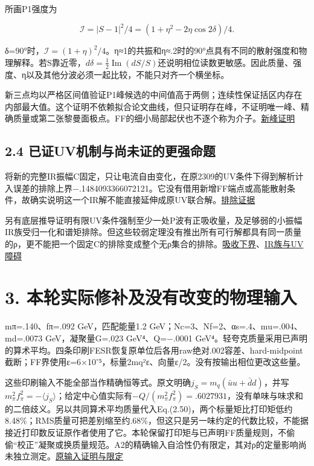\documentclass[
  10pt,
  a4paper,
]{article}
\begin{document}
所画P1强度为

\[\mathcal I=|S-1|^2/4=(1+\eta^2-2\eta\cos2\delta)/4.\]

δ=90°时，\(\mathcal I=(1+\eta)^2/4\)。η≈1的共振和η≈.2时的90°点具有不同的散射强度和物理解释。若S靠近零，\(d\delta=\frac12\operatorname{Im}(dS/S)\)还说明相位读数更敏感。因此质量、强度、η以及其他分波必须一起比较，不能只对齐一个横坐标。

新三点均以严格区间值验证P1峰候选的中间值高于两侧；连续性保证括区内存在内部最大值。这个证明不依赖拟合论文曲线，但只证明存在峰，不证明唯一峰、精确质量或第二张黎曼面极点。FF的细小局部起伏也不逐个称为介子。\href{../FINE_SIGNAL_PEAK_PROOF_ZH.md}{新峰证明}

\subsection{2.4
已证UV机制与尚未证的更强命题}\label{ux5df2ux8bc1uvux673aux5236ux4e0eux5c1aux672aux8bc1ux7684ux66f4ux5f3aux547dux9898}

将新的完整IR振幅C固定，只让电流自由变化，在原2309的UV条件下得到解析计入误差的排除上界−.1484093366072121。它没有借用新增FF端点或高能散射条件，故确实说明这一个IR解不能直接延伸成原UV联合解。\href{../FINE_IR_UV_EXCLUSION.json}{排除证据}

另有底层推导证明有限UV条件强制至少一处P波有正吸收量，及足够弱的小振幅IR族受归一化和谱矩排除。但这些较弱定理没有推出所有可行解都具有同一质量的ρ，更不能把一个固定C的排除变成整个无ρ集合的排除。\href{../../../evidence/UV_FORCED_P_WAVE_ABSORPTION_20260911.md}{吸收下界}、\href{../../../evidence/GLOBAL_IR_SEED_AND_UV_OBSTRUCTION_20260911.md}{IR族与UV障碍}

\section{3.
本轮实际修补及没有改变的物理输入}\label{ux672cux8f6eux5b9eux9645ux4feeux8865ux53caux6ca1ux6709ux6539ux53d8ux7684ux7269ux7406ux8f93ux5165}

mπ=.140、fπ=.092 GeV，匹配能量1.2
GeV；Nc=3、Nf=2、αs=.4、mu=.004、md=.0073 GeV，凝聚量G=.023
GeV⁴、Q=−.0001
GeV⁴。轻夸克质量采用已声明的算术平均。四条印刷FESR恢复原单位后各用raw绝对.002容差、hard-midpoint截断；FF界使用ε=6×10⁻⁵，标量2mq²ε、向量ε/2。没有按输出相位更改这些量。

这些印刷输入不能全部当作精确恒等式。原文明确\(j_S=m_q(\bar uu+\bar dd)\)，并写\(m_\pi^2f_\pi^2=-\langle j_S\rangle\)；给定中心值实际有\(-Q/(m_\pi^2f_\pi^2)=.6027931\)，没有单味与味求和的二倍歧义。另以共同算术平均质量代入Eq.(2.50)，两个标量矩比打印矩低约8.48\%；RMS质量可把差别缩至约.68\%，但这只是另一味约定的代数比较，不能据接近打印数反证原作者使用了它。本轮保留打印矩与已声明FF质量规则，不偷偷``校正''凝聚或换质量规范。A2的精确输入自洽性仍有限定，其对ρ的定量影响尚未独立测定。\href{../../../evidence/FOUNDATIONS_PROOFS_20260910.md}{原输入证明与限定}
\end{document}
